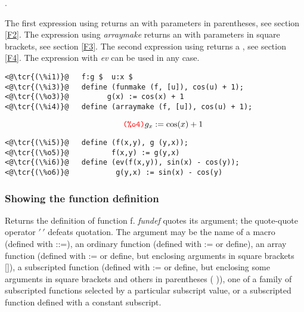 \documentclass[../Maxima_Workbook.tex]{subfiles}
\begin{document}
\lz {}



.

\lz The first expression using  returns an  with parameters in parentheses, see section \ref{F2}. The expression using \emph{arraymake} returns an  with parameters in square brackets, see section \ref{F3}. The second expression using  returns a , see section \ref{F4}. The expression with \emph{ev} can be used in any case.

\lz \begin{lstlisting}
<@\tcr{(\%i1)}@   f:g $  u:x $
<@\tcr{(\%i3)}@   define (funmake (f, [u]), cos(u) + 1);
<@\tcr{(\%o3)}@			g(x) := cos(x) + 1
<@\tcr{(\%i4)}@   define (arraymake (f, [u]), cos(u) + 1);
\end{lstlisting}
\vspace{-5.5mm} \begin{small}
\color{blue} \leqn
\[ \tag*{\tcr{\ttfamily (\%o4)}} g_x := \cos(x)+1 \]
\color{black} \reqn
\end{small}
\vspace{-10.5mm} \begin{lstlisting}
<@\tcr{(\%i5)}@   define (f(x,y), g (y,x));
<@\tcr{(\%o5)}@			 f(x,y) := g(y,x)
<@\tcr{(\%i6)}@   define (ev(f(x,y)), sin(x) - cos(y));
<@\tcr{(\%o6)}@		      g(y,x) := sin(x) - cos(y)
\end{lstlisting}
\vspace{-2mm} 

\subsubsection{Showing the function definition}

\lz {} \hfill \tcr{[function]}

\lz Returns the definition of function f. \emph{fundef} quotes its argument; the quote-quote operator $ ' \, ' $ defeats quotation. The argument may be the name of a macro (defined with ::=), an ordinary function (defined with := or define), an array function (defined with := or define, but enclosing arguments in square brackets []), a subscripted function (defined with := or define, but enclosing some arguments in square brackets and others in parentheses ( )), one of a family of subscripted functions selected by a particular subscript value, or a subscripted function defined with a constant subscript.
\end{document}
